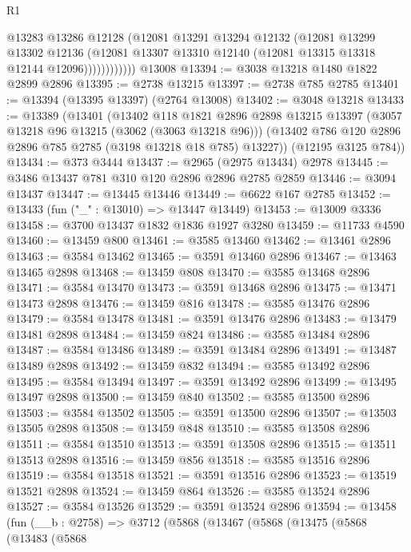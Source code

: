 \begin{lexlean}{R1}
\begin{coremodule}
                    @13283
                    @13286
                    @12128
                    (@12081
                      @13291
                      @13294
                      @12132
                      (@12081
                        @13299
                        @13302
                        @12136
                        (@12081 @13307 @13310 @12140 (@12081 @13315 @13318 @12144 @12096))))))))))))
    @13008
@13394 := @3038 @13218 @1480 @1822 @2899 @2896
@13395 := @2738 @13215
@13397 := @2738 @785 @2785
@13401 := @13394 (@13395 @13397) (@2764 @13008)
@13402 := @3048 @13218
@13433 := @13389
    (@13401
      (@13402
        @118
        @1821
        @2896
        @2898
        @13215
        @13397
        (@3057 @13218 @96 @13215 (@3062 (@3063 @13218 @96)))
        (@13402 @786 @120 @2896 @2896 @785 @2785 (@3198 @13218 @18 @785) @13227))
      (@12195 @3125 @784))
@13434 := @373 @3444
@13437 := @2965 (@2975 @13434) @2978
@13445 := @3486 @13437 @781 @310 @120 @2896 @2896 @2785 @2859
@13446 := @3094 @13437
@13447 := @13445 @13446
@13449 := @6622 @167 @2785
@13452 := @13433 (fun ("_" : @13010) => @13447 @13449)
@13453 := @13009 @3336
@13458 := @3700 @13437 @1832 @1836 @1927 @3280
@13459 := @11733 @4590
@13460 := @13459 @800
@13461 := @3585 @13460
@13462 := @13461 @2896
@13463 := @3584 @13462
@13465 := @3591 @13460 @2896
@13467 := @13463 @13465 @2898
@13468 := @13459 @808
@13470 := @3585 @13468 @2896
@13471 := @3584 @13470
@13473 := @3591 @13468 @2896
@13475 := @13471 @13473 @2898
@13476 := @13459 @816
@13478 := @3585 @13476 @2896
@13479 := @3584 @13478
@13481 := @3591 @13476 @2896
@13483 := @13479 @13481 @2898
@13484 := @13459 @824
@13486 := @3585 @13484 @2896
@13487 := @3584 @13486
@13489 := @3591 @13484 @2896
@13491 := @13487 @13489 @2898
@13492 := @13459 @832
@13494 := @3585 @13492 @2896
@13495 := @3584 @13494
@13497 := @3591 @13492 @2896
@13499 := @13495 @13497 @2898
@13500 := @13459 @840
@13502 := @3585 @13500 @2896
@13503 := @3584 @13502
@13505 := @3591 @13500 @2896
@13507 := @13503 @13505 @2898
@13508 := @13459 @848
@13510 := @3585 @13508 @2896
@13511 := @3584 @13510
@13513 := @3591 @13508 @2896
@13515 := @13511 @13513 @2898
@13516 := @13459 @856
@13518 := @3585 @13516 @2896
@13519 := @3584 @13518
@13521 := @3591 @13516 @2896
@13523 := @13519 @13521 @2898
@13524 := @13459 @864
@13526 := @3585 @13524 @2896
@13527 := @3584 @13526
@13529 := @3591 @13524 @2896
@13594 := @13458
    (fun (__b : @2758) =>
    @3712
      (@5868
        (@13467
          (@5868
            (@13475
              (@5868
                (@13483
                  (@5868

\end{coremodule}
\end{lexlean}
